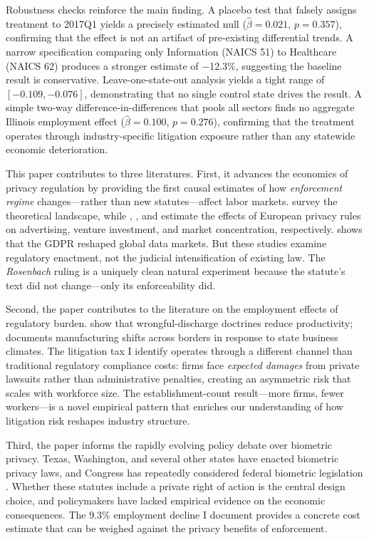 \documentclass[12pt]{article}
\begin{document}
Robustness checks reinforce the main finding. A placebo test that falsely assigns treatment to 2017Q1 yields a precisely estimated null ($\hat{\beta} = 0.021$, $p = 0.357$), confirming that the effect is not an artifact of pre-existing differential trends. A narrow specification comparing only Information (NAICS 51) to Healthcare (NAICS 62) produces a stronger estimate of $-$12.3\%, suggesting the baseline result is conservative. Leave-one-state-out analysis yields a tight range of $[-0.109, -0.076]$, demonstrating that no single control state drives the result. A simple two-way difference-in-differences that pools all sectors finds no aggregate Illinois employment effect ($\hat{\beta} = 0.100$, $p = 0.276$), confirming that the treatment operates through industry-specific litigation exposure rather than any statewide economic deterioration.

This paper contributes to three literatures. First, it advances the economics of privacy regulation by providing the first causal estimates of how \emph{enforcement regime} changes---rather than new statutes---affect labor markets. \citet{acquisti2016} survey the theoretical landscape, while \citet{goldfarb2011}, \citet{jia2021}, and \citet{johnson2021} estimate the effects of European privacy rules on advertising, venture investment, and market concentration, respectively. \citet{peukert2022} shows that the GDPR reshaped global data markets. But these studies examine regulatory enactment, not the judicial intensification of existing law. The \emph{Rosenbach} ruling is a uniquely clean natural experiment because the statute's text did not change---only its enforceability did.

Second, the paper contributes to the literature on the employment effects of regulatory burden. \citet{autor2007} show that wrongful-discharge doctrines reduce productivity; \citet{holmes1998} documents manufacturing shifts across borders in response to state business climates. The litigation tax I identify operates through a different channel than traditional regulatory compliance costs: firms face \emph{expected damages} from private lawsuits rather than administrative penalties, creating an asymmetric risk that scales with workforce size. The establishment-count result---more firms, fewer workers---is a novel empirical pattern that enriches our understanding of how litigation risk reshapes industry structure.

Third, the paper informs the rapidly evolving policy debate over biometric privacy. Texas, Washington, and several other states have enacted biometric privacy laws, and Congress has repeatedly considered federal biometric legislation \citep{greenwald2022, goldsmith2023}. Whether these statutes include a private right of action is the central design choice, and policymakers have lacked empirical evidence on the economic consequences. The 9.3\% employment decline I document provides a concrete cost estimate that can be weighed against the privacy benefits of enforcement.
\end{document}
